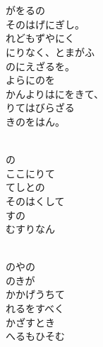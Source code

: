 \documentclass[10pt,b5j]{tarticle} %
\begin{document}
\vspace{1.5em} %
\newcommand{\linespace}{0.5em} %
\newcommand{\blocksize}{0.5\hsize} %
\newcommand{\itemmargin}{6em} %
\begin{enumerate} %
    \setlength{\itemindent}{\itemmargin} %
    \begin{minipage}[c]{\blocksize}
    
        \vspace{\linespace}
        \item~\\
         \\
        がをるの\\
        そのはげにぎし。\\
        れどもずやにく\\
        にりなく、とまがふ\\
        のにえざるを。\\
        よらにのを\\
        かんよりはにをきて、\\
        りてはびらざる\\
        きのをはん。
        
        \vspace{\linespace}
        \item~\\
        の\\
        ここにりて\\
        てしとの\\
        そのはくして\\
        すの\\
        むすりなん
        
        \vspace{\linespace}
        \item~\\
        のやの\\
        のきが\\
        かかげうちて\\
        れるをすべく\\
        かざすとき\\
        へるもひそむ
        

\end{minipage}
\end{enumerate}
\end{document}

